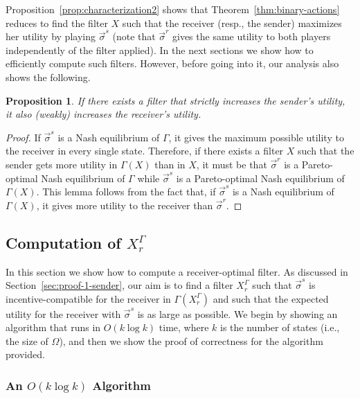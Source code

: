 \documentclass[submission,copyright,creativecommons]{eptcs}
\newtheorem{proposition}{Proposition}
\begin{document}
Proposition~\ref{prop:characterization2} shows that Theorem~\ref{thm:binary-actions} reduces to find the filter $X$ such that the receiver (resp., the sender) maximizes her utility by playing $\vec{\sigma}^s$ (note that $\vec{\sigma}^r$ gives the same utility to both players independently of the filter applied). In the next sections we show how to efficiently compute such filters. However, before going into it, our analysis also shows the following.

\begin{proposition}\label{prop:pareto}
    If there exists a filter that strictly increases the sender's utility, it also (weakly) increases the receiver's utility.
\end{proposition}

\begin{proof}
If $\vec{\sigma}^s$ is a Nash equilibrium of $\Gamma$, it gives the maximum possible utility to the receiver in every single state. Therefore, if there exists a filter $X$ such that the sender gets more utility in $\Gamma(X)$ than in $X$, it must be that $\vec{\sigma}^r$ is a Pareto-optimal Nash equilibrium of $\Gamma$ while $\vec{\sigma}^s$ is a Pareto-optimal Nash equilibrium of $\Gamma(X)$. This lemma follows from the fact that, if $\vec{\sigma}^s$ is a Nash equilibrium of $\Gamma(X)$, it gives more utility to the receiver than $\vec{\sigma}^r$.
\end{proof}

\subsection{Computation of $X^\Gamma_r$}\label{sec:algorithm}

In this section we show how to compute a receiver-optimal filter. As discussed in Section~\ref{sec:proof-1-sender}, our aim is to find a filter $X^\Gamma_r$ such that $\vec{\sigma}^s$ is incentive-compatible for the receiver in $\Gamma(X^\Gamma_r)$ and such that the expected utility for the receiver with $\vec{\sigma}^s$ is as large as possible. We begin by showing an algorithm that runs in $O(k \log k)$ time, where $k$ is the number of states (i.e., the size of $\Omega$), and then we show the proof of correctness for the algorithm provided.

\subsubsection{An $O(k \log k)$ Algorithm}
\end{document}
